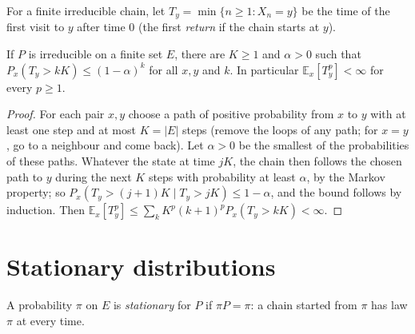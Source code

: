 For a finite irreducible chain, let $T_y=\min\{n\ge1:X_n=y\}$ be the time of the first visit to $y$ after time $0$ (the first \emph{return} if
the chain starts at $y$).

\begin{lemma}\label{lem:hitting}
If $P$ is irreducible on a finite set $E$, there are $K\ge1$ and $\alpha>0$ such that $P_x(T_y>kK)\le(1-\alpha)^k$ for all $x,y$ and $k$. In particular
$\mathbb E_x[T_y^p]<\infty$ for every $p\ge1$.
\end{lemma}
\begin{proof}
For each pair $x,y$ choose a path of positive probability from $x$ to $y$ with at least one step and at most $K=|E|$ steps (remove the
loops of any path; for $x=y$, go to a neighbour and come back). Let $\alpha>0$ be the smallest of the probabilities of these
paths. Whatever the state at time $jK$, the chain then follows the chosen path to $y$ during the next $K$ steps with probability
at least $\alpha$, by the Markov property; so $P_x(T_y>(j+1)K\mid T_y>jK)\le1-\alpha$, and the bound follows by induction. Then
$\mathbb E_x[T_y^p]\le\sum_kK^p(k+1)^pP_x(T_y>kK)<\infty$.
\end{proof}

\section{Stationary distributions}

A probability $\pi$ on $E$ is \emph{stationary} for $P$ if $\pi P=\pi$: a chain started from $\pi$ has law $\pi$ at every time.

